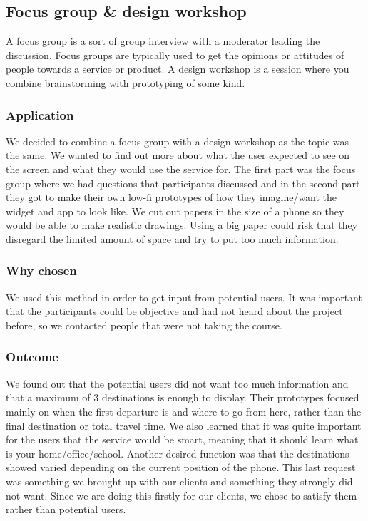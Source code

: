 \documentclass[a4paper]{article}
\begin{document}
\subsection{Focus group \& design workshop}
A focus group is a sort of group interview with a moderator leading the discussion. Focus groups are typically used to get the opinions or attitudes of people towards a service or product. A design workshop is a session where you combine brainstorming with prototyping of some kind.
		\subsubsection{Application}
We decided to combine a focus group with a design workshop as the topic was the same. We wanted to find out more about what the user expected to see on the screen and what they would use the service for. The first part was the focus group where we had questions that participants discussed and in the second part they got to make their own low-fi prototypes of how they imagine/want the widget and app to look like. We cut out papers in the size of a phone so they would be able to make realistic drawings. Using a big paper could risk that they disregard the limited amount of space and try to put too much information.
	
		\subsubsection{Why chosen}
We used this method in order to get input from potential users. It was important that the participants could be objective and had not heard about the project before, so we contacted people that were not taking the course.
		\subsubsection{Outcome}
We found out that the potential users did not want too much information and that a maximum of 3 destinations is enough to display. Their prototypes focused mainly on when the first departure is and where to go from here, rather than the final destination or total travel time. We also learned that it was quite important for the users that the service would be smart, meaning that it should learn what is your home/office/school. Another desired function was that the destinations showed varied depending on the current position of the phone. This last request was something we brought up with our clients and something they strongly did not want. Since we are doing this firstly for our clients, we chose to satisfy them rather than potential users.
	
\end{document}

